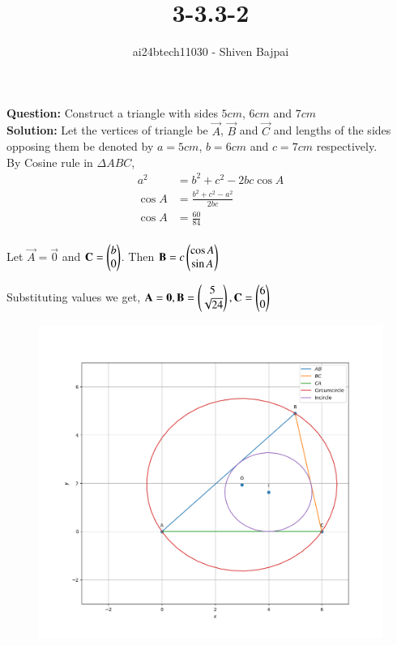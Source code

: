 \documentclass[journal]{IEEEtran}
\begin{document}
\onecolumn

\vspace{3cm}

\renewcommand{\thefigure}{\theenumi}
\renewcommand{\thetable}{\theenumi}

\title{3-3.3-2}
\author{ai24btech11030 - Shiven Bajpai}
\maketitle

\renewcommand{\thefigure}{\theenumi}
\renewcommand{\thetable}{\theenumi}

\textbf{Question: } Construct a triangle with sides $5cm$, $6cm$ and $7cm$
\\

\textbf{Solution: } Let the vertices of triangle be $\vec{A}$, $\vec{B}$ and $\vec{C}$ and lengths of the sides opposing them be denoted by $a = 5cm$, $b = 6cm$ and $c = 7cm$ respectively.
\\

By Cosine rule in $\Delta ABC$,
\begin{align*}
	a^2 &= b^2 + c^2 - 2bc \cos A\\
	\cos A &= \frac{b^2 + c^2 - a^2}{2bc}\\
	\cos A &= \frac{60}{84}\\
\end{align*}

Let $\vec{A} = \vec{0}$ and $\mathbf{C} = \begin{pmatrix}b \\ 0\end{pmatrix}$. Then $\mathbf{B} = c\begin{pmatrix}\cos A \\ \sin A\end{pmatrix}$

Substituting values we get, $\mathbf{A} = \mathbf{0}, \mathbf{B} = \begin{pmatrix}5 \\ \sqrt{24}\end{pmatrix}, \mathbf{C} = \begin{pmatrix}6 \\ 0\end{pmatrix}$

\newpage
\begin{figure}[H]
	\centering
	\includegraphics[width=0.75\columnwidth]{Figures/Figure.png}
	\label{fig}
\end{figure}
\end{document}
